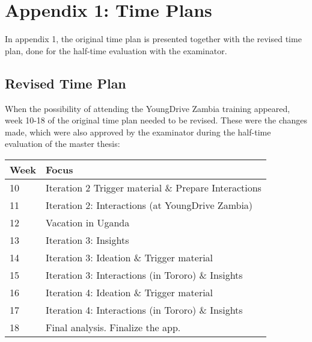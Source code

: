\chapter{Appendix 1: Time Plans}\label{cha:appendix1}


In appendix 1, the original time plan is presented together with the revised time plan, done for the half-time evaluation with the examinator.



\section{Revised Time Plan}

When the possibility of attending the YoungDrive Zambia training appeared, week 10-18 of the original time plan needed to be revised. These were the changes made, which were also approved by the examinator during the half-time evaluation of the master thesis:

\begin{center}
    \begin{tabular}{ | l | p{10cm} |}
    \hline
    Week & Focus \\ \hline
    10 & Iteration 2 Trigger material \& Prepare Interactions \\ \hline
    11 & Iteration 2: Interactions (at YoungDrive Zambia) \\ \hline
    12 & Vacation in Uganda \\ \hline
    13 & Iteration 3: Insights \\ \hline
    14 & Iteration 3: Ideation \& Trigger material \\ \hline
    15 & Iteration 3: Interactions (in Tororo) \& Insights \\ \hline
    16 & Iteration 4: Ideation \& Trigger material \\ \hline
    17 & Iteration 4: Interactions (in Tororo) \& Insights \\ \hline
    18 & Final analysis. Finalize the app. \\ \hline
    \end{tabular}
\end{center}

